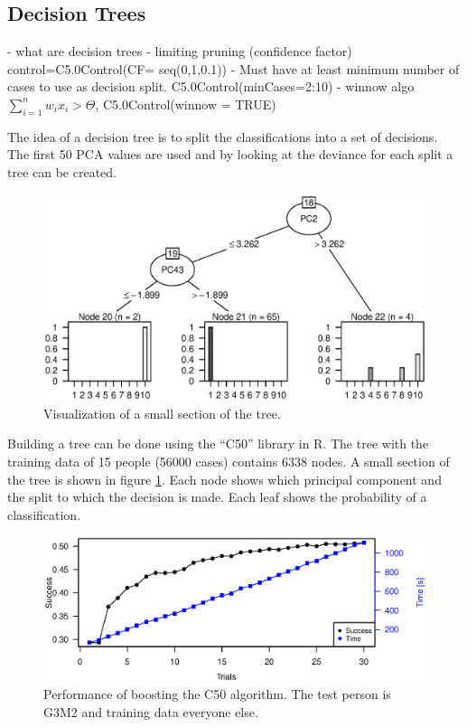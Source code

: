 \subsection{Decision Trees}

- what are decision trees
- limiting pruning (confidence factor) control=C5.0Control(CF= seq(0,1,0.1))
- Must have at least minimum number of cases to use as decision split. C5.0Control(minCases=2:10)
- winnow algo \(\sum_{i=1}^{n} w_i x_i > \Theta\), C5.0Control(winnow = TRUE)


The idea of a decision tree is to split the classifications into a set of decisions.
The first 50 PCA values are used and by looking at the deviance for each split a tree can be created.

\begin{figure}[h]
\includegraphics[width = \textwidth]{graphics/tree_section}
\caption[Visualization of a tree.]{Visualization of a small section of the tree.}
\label{fig:tree_section}
\end{figure}

Building a tree can be done using the ``C50'' library in R.
The tree with the training data of 15 people (56000 cases) contains 6338 nodes.
A small section of the tree is shown in figure \ref{fig:tree_section}.
Each node shows which principal component and the split to which the decision is made.
Each leaf shows the probability of a classification.

\begin{figure}[H]
\includegraphics[width = \textwidth]{graphics/tree_timing_entropy}
\caption[Performance of boosting the C50 algorithm.]{Performance of boosting the C50 algorithm. The test person is G3M2 and training data everyone else.}
\label{fig:tree_timing}
\end{figure}

